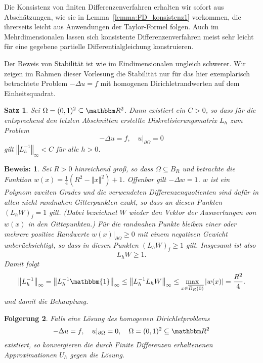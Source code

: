 \documentclass[12pt,a4paper]{book}
\theoremstyle{break}
\newtheorem{theorem}{Satz}[chapter]
\newtheorem{korollar}[theorem]{Folgerung}
\theoremstyle{nonumberplain}
\newtheorem{beweis}{Beweis:}
\newcommand{\R}{\mathbbm R}
\newcommand{\norm}[1]{\left\Vert#1\right\Vert}		%
\newcommand{\1}{\mathbbm{1}} 			      	%
\begin{document}
Die Konsistenz von finiten Differenzenverfahren erhalten wir sofort aus Abschätzungen, wie sie in Lemma~\ref{lemma:FD_konsistenz1}
vorkommen, die ihrerseits leicht aus Anwendungen der Taylor-Formel folgen. Auch im Mehrdimensionalen lassen
sich konsistente Differenzenverfahren meist sehr leicht für eine gegebene partielle Differentialgleichung konstruieren. 

Der Beweis von Stabilität ist wie im Eindimensionalen ungleich schwerer. %
Wir zeigen im Rahmen dieser Vorlesung die Stabilität nur für das hier exemplarisch betrachtete 
Problem $-\Delta u=f$ mit homogenen Dirichletrandwerten auf dem Einheitsquadrat.

\begin{theorem}
Sei $\Omega=(0,1)^2\subseteq \R^2$. Dann existiert ein $C>0$, so dass für die entsprechend den
letzten Abschnitten erstellte Diskretisierungsmatrix $L_h$ zum Problem 
\[
-\Delta u=f, \quad u|_{\partial \Omega}=0
\]
gilt $\norm{L_h^{-1}}_\infty < C$ für alle $h>0$. 
\end{theorem}
\begin{beweis}
Sei $R>0$ hinreichend groß, so dass $\Omega\subseteq B_{R}$ und betrachte die Funktion $w(x)=\frac{1}{4}\left( R^2 -\norm{x}^2 \right)+1$. 
Offenbar gilt $-\Delta w=1$. $w$ ist ein Polynom zweiten Grades und die verwendeten Differenzenquotienten sind dafür 
in allen nicht randnahen Gitterpunkten exakt, so dass an diesen Punkten $(L_h W)_j=1$ gilt. (Dabei bezeichnet $W$ wieder den 
Vektor der Auswertungen von $w(x)$ in den Gittepunkten.) Für die randnahen Punkte bleiben einer oder
mehrere positive Randwerte $w(x)|_{\partial \Omega}\geq 0$ 
mit einem negativen Gewicht unberücksichtigt, so dass in diesen Punkten $(L_h W)_j\geq 1$ gilt.
Insgesamt ist also 
\[
L_h W\geq 1.
\]
Damit folgt
\[
\norm{L_h^{-1}}_\infty= \norm{L_h^{-1} \1}_\infty\leq \norm{L_h^{-1} L_h W}_\infty \leq \max_{x\in \overline{B_R(0)}} |w(x)|= \frac{R^2}{4}.
\]
und damit die Behauptung.
\end{beweis}

\begin{korollar}
Falls eine Lösung des homogenen Dirichletproblems
\[
-\Delta u=f, \quad u|_{\partial \Omega}=0, \quad \Omega=(0,1)^2\subseteq \R^2
\]
existiert, so konvergieren die durch Finite Differenzen erhaltenenen Approximationen $U_h$ gegen die Lösung. 
\end{korollar}
\end{document}
